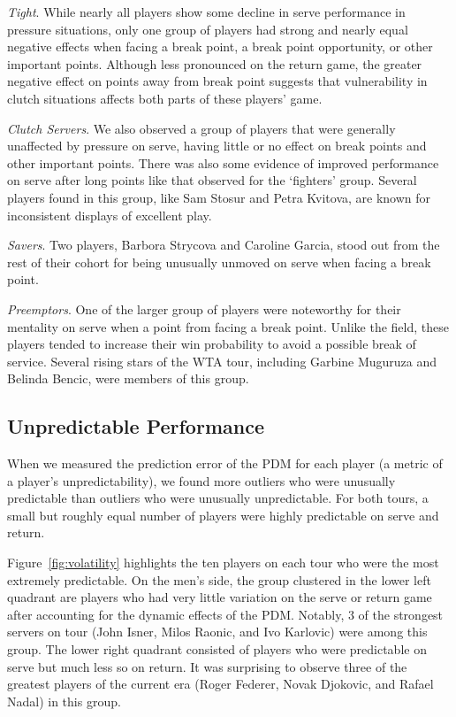 \documentclass{Latex/svjour3}
\begin{document}
\textit{Tight}. While nearly all players show some decline in serve performance
in pressure situations, only one group of players had strong and nearly equal
negative effects when facing a break point, a break point opportunity, or other
important points. Although less pronounced on the return game, the greater
negative effect on points away from break point suggests that vulnerability in
clutch situations affects both parts of these players' game.

\textit{Clutch Servers}. We also observed a group of players that were generally
unaffected by pressure on serve, having little or no effect on break points and
other important points. There was also some evidence of improved performance on
serve after long points like that observed for the `fighters' group. Several
players found in this group, like Sam Stosur and Petra Kvitova, are known for
inconsistent displays of excellent play.

\textit{Savers}. Two players, Barbora Strycova and Caroline Garcia, stood out
from the rest of their cohort for being unusually unmoved on serve when facing a
break point.

\textit{Preemptors}. One of the larger group of players were noteworthy for
their mentality on serve when a point from facing a break point. Unlike the
field, these players tended to increase their win probability to avoid a
possible break of service. Several rising stars of the WTA tour, including
Garbine Muguruza and Belinda Bencic, were members of this group.

\subsection{Unpredictable Performance}

When we measured the prediction error of the PDM for each player (a metric of a
player's unpredictability), we found more outliers who were unusually
predictable than outliers who were unusually unpredictable. For both tours, a
small but roughly equal number of players were highly predictable on serve and
return.

Figure~\ref{fig:volatility} highlights the ten players on each tour who were the
most extremely predictable. On the men's side, the group clustered in the lower
left quadrant are players who had very little variation on the serve or return
game after accounting for the dynamic effects of the PDM. Notably, 3 of the
strongest servers on tour (John Isner, Milos Raonic, and Ivo Karlovic) were
among this group. The lower right quadrant consisted of players who were
predictable on serve but much less so on return. It was surprising to observe
three of the greatest players of the current era (Roger Federer, Novak Djokovic,
and Rafael Nadal) in this group. 
\end{document}
